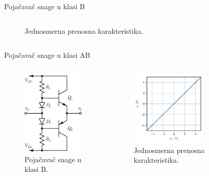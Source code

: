 \documentclass[aspectratio=169,xcolor=dvipsnames]{beamer}
\begin{document}
\begin{frame}{Pojačavač snage u klasi B}
\begin{columns}[c]
\begin{column}{.5\textwidth}
\begin{figure}
        \caption{Jednosmerna prenosna karakteristika.}
    \end{figure}
    \end{column}
\end{columns}
\end{frame}



\begin{frame}{Pojačavač snage u klasi AB}
	\begin{columns}[c]
    \begin{column}{.5\textwidth}
    \begin{figure}
        \centering
        \includegraphics[scale = 0.75]{fig/PAAB.pdf}
        \caption{Pojačavač snage u klasi B.}
    \end{figure}      
    \end{column}
    \begin{column}{.5\textwidth}
    \begin{figure}
        \centering
        \includegraphics[width=0.65\textwidth]{fig/PAABkka.pdf}
        \caption{Jednosmerna prenosna karakteristika.}
    \end{figure}
    \end{column}
\end{columns}
\end{frame}
\end{document}
